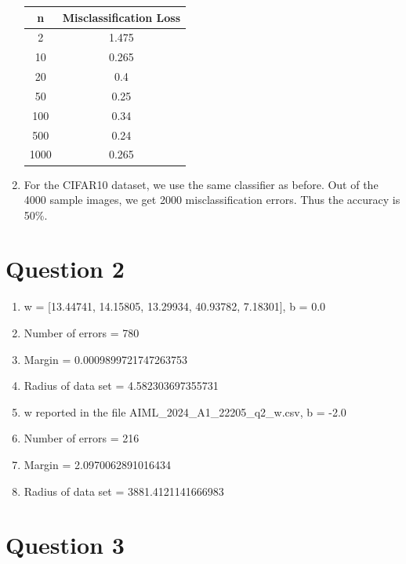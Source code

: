 \documentclass[12pt]{article}
\begin{document}
\begin{enumerate}[leftmargin=*]
    \begin{center}
        \begin{tabular}{|c|c|}
            \hline
            n & Misclassification Loss \\
            \hline
            2 & 1.475 \\
            10 & 0.265 \\
            20 & 0.4 \\
            50 & 0.25 \\
            100 & 0.34 \\
            500 & 0.24 \\
            1000 & 0.265 \\
            \hline
        \end{tabular}
    \end{center}

    \vspace*{1cm}
    \item For the CIFAR10 dataset, we use the same classifier as before. Out of the 4000 sample images, we get 2000 misclassification errors. Thus the accuracy is 50\%.
\end{enumerate}

\pagebreak
\section*{Question 2}
\begin{enumerate}
    \item w = [13.44741, 14.15805, 13.29934, 40.93782,  7.18301], b = 0.0
    \item Number of errors = 780
    \item Margin = 0.0009899721747263753
    \item Radius of data set = 4.582303697355731
    \item w reported in the file AIML\_2024\_A1\_22205\_q2\_w.csv, b = -2.0
    \item Number of errors = 216
    \item Margin = 2.0970062891016434
    \item Radius of data set = 3881.4121141666983
\end{enumerate}


\section*{Question 3}
\end{document}
